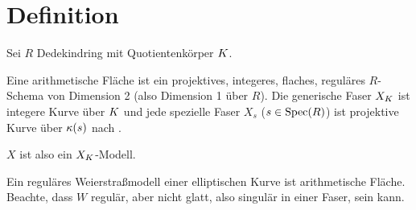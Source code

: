 \documentclass[german]{scrreprt}
\begin{document}
\section{Definition}
\begin{Definition}
  Sei $R$ Dedekindring mit Quotientenkörper $K$.

  
  Eine arithmetische Fläche ist ein projektives, integeres, flaches,
  reguläres $R$-Schema von Dimension 2 (also Dimension 1 über $R$).
  Die generische Faser $X_{K}$ ist integere Kurve über $K$ und jede
  spezielle Faser $X_s$ ($s\in\operatorname{Spec}(R)$) ist projektive Kurve über
  $\kappa(s)$ nach \cite[Lemma 8.3.3]{liu}.
  
  $X$ ist also ein $X_{K}$-Modell.
\end{Definition}

\begin{Beispiel}
  Ein reguläres Weierstraßmodell einer elliptischen Kurve ist
  arithmetische Fläche.
  Beachte, dass $W$ regulär, aber nicht glatt, also singulär in einer
  Faser, sein kann.
\end{Beispiel}
\end{document}
